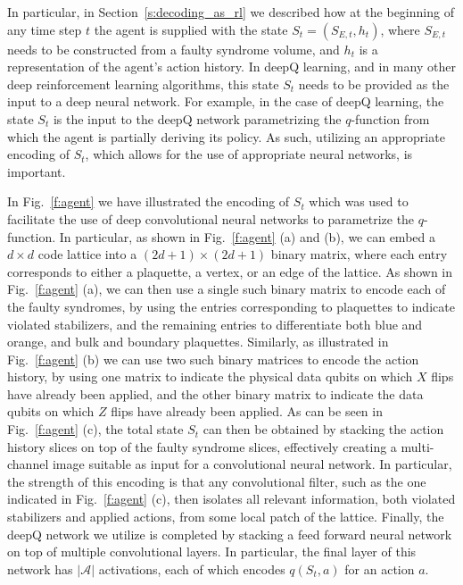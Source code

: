 \documentclass[twocolumn,preprintnumbers,amsmath,amssymb,notitlepage,nofootinbib,longbibliography,superscriptaddress,aps,pra,10pt]{revtex4-1}
\begin{document}
	In particular, in Section~\ref{s:decoding_as_rl} we described how at the beginning of any time step $t$ the agent is supplied with the state $S_{t}=(S_{E,{t}},h_{t})$,
	where $S_{E,{t}}$ needs to be constructed from a faulty syndrome volume, and $h_{t}$ is a representation of the agent's action history.
	In deepQ learning, and in many other deep reinforcement learning algorithms, this state $S_t$ needs to be provided as the input to a deep neural network.
	For example, in the case of deepQ learning, the state $S_t$ is the input to the deepQ network parametrizing the $q$-function from which the agent is partially deriving its policy.
	As such, utilizing an appropriate encoding of $S_t$, which allows for the use of appropriate neural networks, is important.

	In Fig.~\ref{f:agent} we have illustrated the encoding of $S_t$ which was used to facilitate the use of deep convolutional neural networks to parametrize the $q$-function.
	In particular, as shown in Fig.~\ref{f:agent} (a) and (b), we can embed a $d\times d$ code lattice into a $(2d + 1)\times(2d+1)$ binary matrix, where each entry corresponds to either a plaquette, a vertex, or an edge of the lattice.
	As shown in Fig.~\ref{f:agent} (a), we can then use a single such binary matrix to encode each of the faulty syndromes, by using the entries corresponding to plaquettes to indicate violated stabilizers, and the remaining entries to differentiate both blue and orange, and bulk and boundary plaquettes.
	Similarly, as illustrated in  Fig.~\ref{f:agent} (b) we can use two such binary matrices to encode the action history, by using one matrix to indicate the physical data qubits on which $X$ flips have already been applied, and the other binary matrix to indicate the data qubits on which $Z$ flips have already been applied.
	As can be seen in Fig.~\ref{f:agent} (c), the total state $S_t$ can then be obtained by stacking the action history slices on top of the faulty syndrome slices, effectively creating a multi-channel image suitable as input for a convolutional neural network.
	In particular, the strength of this encoding is that any convolutional filter, such as the one indicated in Fig.~\ref{f:agent} (c), then isolates all relevant information, both violated stabilizers and applied actions, from some local patch of the lattice.
	Finally, the deepQ network we utilize is completed by stacking a feed forward neural network on top of multiple convolutional layers.
	In particular, the final layer of this network has $|\mathcal{A}|$ activations, each of which encodes $q(S_t,a)$ for an action $a$.
\end{document}
